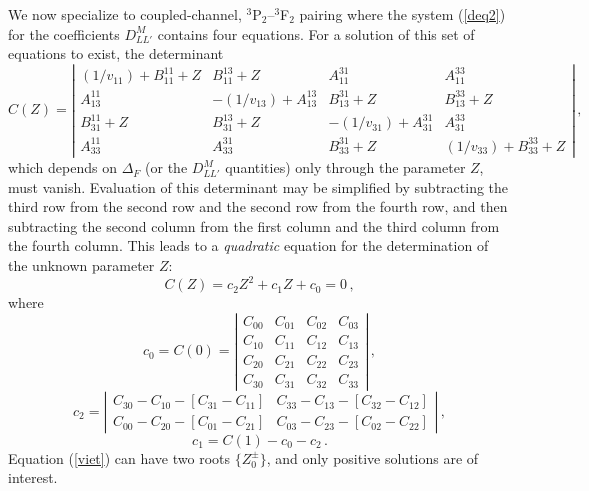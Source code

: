 We now specialize to coupled-channel, $^3$P$_2$--$^3$F$_2$ pairing 
where the system (\ref{deq2}) for the coefficients $D_{LL'}^M$
contains four equations.  For a solution of this set of equations 
to exist, the determinant
\begin{equation}
C(Z) =
\left|
\begin{array}{cccc}
(1/v_{11}) + B^{11}_{11} + Z & B^{13}_{11} + Z & A^{31}_{11}
& A^{33}_{11} \\
A^{11}_{13} & -(1/v_{13}) + A^{13}_{13} & B^{31}_{13} + Z
& B^{33}_{13} + Z \\
B^{11}_{31} + Z & B^{13}_{31} + Z & -(1/v_{31}) + A^{31}_{31}
& A^{33}_{31} \\
A^{11}_{33} & A^{31}_{33} & B^{31}_{33} + Z & (1/v_{33}) +
B^{33}_{33} + Z
\end{array}
\right| \, ,\label{det}
\end{equation}
which depends on $\Delta_F$ (or the $D_{LL'}^M$ quantities) only
through the parameter $Z$, must vanish.
Evaluation of this determinant may be simplified by subtracting the
third row from the second row and the second row from
the fourth row, and then subtracting the second column
from the first column and the third column from the fourth column.
This leads to a {\it quadratic} equation for the determination
of the unknown parameter $Z$:
\begin{equation}
C(Z) = c_2 Z^2 + c_1 Z + c_0 = 0 \, ,
\label{viet}
\end{equation}
where
\begin{equation}
c_0 = C(0) =
\left|
\begin{array}{cccc}
C_{00} & C_{01} & C_{02} & C_{03} \\
C_{10} & C_{11} & C_{12} & C_{13} \\
C_{20} & C_{21} & C_{22} & C_{23} \\
C_{30} & C_{31} & C_{32} & C_{33}
\end{array}
\right| \, ,
\end{equation}
\begin{equation}
c_2 =
\left|
\begin{array}{cc}
C_{30} - C_{10} - [C_{31} - C_{11}] & C_{33} - C_{13} - [C_{32} - C_{12}]\\
C_{00} - C_{20} - [C_{01} - C_{21}] & C_{03} - C_{23} - [C_{02} - C_{22}]
\end{array}
\right| \, ,
\end{equation}
\begin{equation}
c_1 = C(1) - c_0 - c_2 \, .
\end{equation}
Equation (\ref{viet}) can have two roots $\{Z^\pm_0\}$, and
only positive solutions are of interest.

